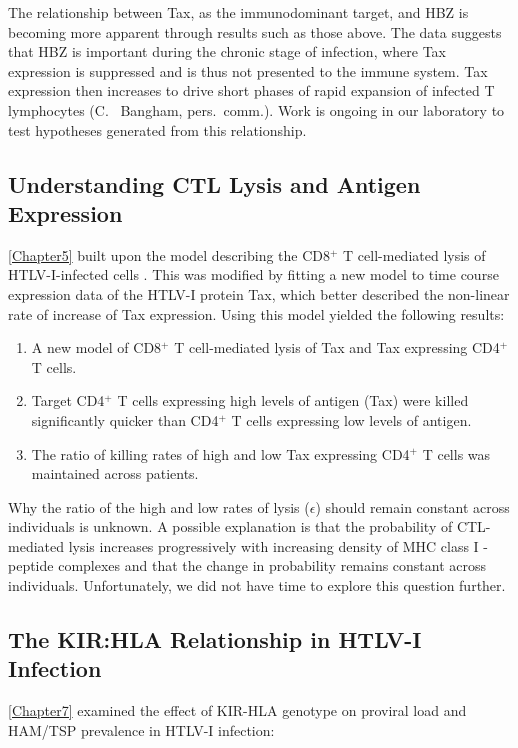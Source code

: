 The relationship between Tax, as the immunodominant target, and HBZ is becoming more apparent through results such as those above. The data suggests that HBZ is important during the chronic stage of infection, where Tax expression is suppressed and is thus not presented to the immune system. Tax expression then increases to drive short phases of rapid expansion of infected T lymphocytes (C.~ Bangham, pers.~comm.). Work is ongoing in our laboratory to test hypotheses generated from this relationship.

\subsection{Understanding CTL Lysis and Antigen Expression}

\cref{Chapter5} built upon the model describing the CD8$^+$ T cell-mediated lysis of HTLV-I-infected cells \citep{Asquith2005a}. This was modified by fitting a new model to time course expression data of the HTLV-I protein Tax, which better described the non-linear rate of increase of Tax expression. Using this model yielded the following results:

\begin{enumerate}[(1)]
\item A new model of CD8$^+$ T cell-mediated lysis of Tax and Tax expressing CD4$^+$ T cells.
\item Target CD4$^+$ T cells expressing high levels of antigen (Tax) were killed significantly quicker than CD4$^+$ T cells expressing low levels of antigen.
\item The ratio of killing rates of high and low Tax expressing CD4$^+$ T cells was maintained across patients. 
\end{enumerate}

Why the ratio of the high and low rates of lysis ($\epsilon$) should remain constant across individuals is unknown. A possible explanation is that the probability of CTL-mediated lysis increases progressively with increasing density of MHC class I - peptide complexes and that the change in probability remains constant across individuals. Unfortunately, we did not have time to explore this question further.   

\subsection{The KIR:HLA Relationship in HTLV-I Infection}

\cref{Chapter7} examined the effect of KIR-HLA genotype on proviral load and HAM/TSP prevalence in HTLV-I infection:

